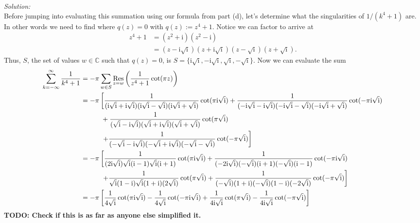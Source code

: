 \documentclass[10pt]{amsart}
\newcommand{\I}{\mathrm{i}}
\theoremstyle{nonumberplain}
\begin{document}
\begin{enumerate}[label={\bf {\arabic*}:}]
\begin{enumerate}
\begin{enumerate}
\noindent
\textit{Solution:} \\
Before jumping into evaluating this summation using our formula from part (d), let's determine what the singularities of $1/(k^4 + 1)$ are.
In other words we need to find where $q(z) = 0$ with $q(z) := z^4 + 1$.
Notice we can factor to arrive at
\begin{align*}
z^4 + 1 &= (z^2 + \I)(z^2 - \I) \\
	&= (z - \I \sqrt{\I})(z + \I \sqrt{\I})(z - \sqrt{\I})(z + \sqrt{\I}).
\end{align*}
Thus, $S$, the set of values $w \in \mathbb C$ such that $q(z) = 0$, is  $S = \{ \I \sqrt{\I}, - \I \sqrt{\I}, \sqrt{\I}, - \sqrt{\I} \}$.
Now we can evaluate the sum
\begin{align*}
\sum_{k=-\infty}^{\infty} \frac{1}{k^4 + 1}
	&= - \pi \sum_{w \in S} \underset{z=w}{ \rm Res} \left( \frac{1}{z^4 + 1} \cot (\pi z) \right) \\
	&= - \pi \left[ \frac 1 {(\I \sqrt \I + \I \sqrt{\I})(\I \sqrt \I - \sqrt{\I})(\I \sqrt \I + \sqrt{\I})} \cot (\pi \I \sqrt{\I}) + \frac 1 {(- \I \sqrt{\I} - \I \sqrt{\I})(- \I \sqrt{\I} - \sqrt{\I})(- \I \sqrt{\I} + \sqrt{\I})} \cot (- \pi \I \sqrt{\I}) \right. \\
		&\quad\quad\quad + \frac 1 {(\sqrt \I - \I \sqrt{\I})(\sqrt \I + \I \sqrt{\I})(\sqrt \I + \sqrt{\I})} \cot (\pi \sqrt{\I}) \\
		&\quad\quad\quad \left. + \frac 1 {(- \sqrt \I - \I \sqrt{\I})(- \sqrt \I + \I \sqrt{\I})(- \sqrt \I - \sqrt{\I})} \cot (- \pi \sqrt{\I}) \right] \\
	&= - \pi \left[ \frac 1 {(2 \I \sqrt \I)\sqrt \I(\I  - 1)\sqrt \I (\I + 1)} \cot (\pi \I \sqrt{\I}) + \frac 1 {(- 2\I \sqrt{\I})(- \sqrt \I)(\I + 1)(- \sqrt \I)(\I - 1)} \cot (- \pi \I \sqrt{\I}) \right. \\
		&  \left. \quad\quad\quad + \frac 1 {\sqrt \I(1 - \I )\sqrt \I(1 + \I )(2 \sqrt \I )} \cot (\pi \sqrt{\I}) + \frac 1 {(- \sqrt \I)(1 + \I )(- \sqrt \I)(1 - \I )(- 2\sqrt \I)} \cot (- \pi \sqrt{\I}) \right] \\
	&= - \pi \left[ \frac 1 {4\sqrt \I} \cot (\pi \I \sqrt{\I}) - \frac 1 {4\sqrt{\I}} \cot (- \pi \I \sqrt{\I}) + \frac 1 {4 \I \sqrt \I } \cot (\pi \sqrt{\I}) - \frac 1 {4 \I\sqrt \I} \cot (- \pi \sqrt{\I}) \right] \\
\end{align*}
\textbf{TODO: Check if this is as far as anyone else simplified it.} \\



\end{enumerate}
\end{enumerate}
\end{enumerate}
\end{document}

